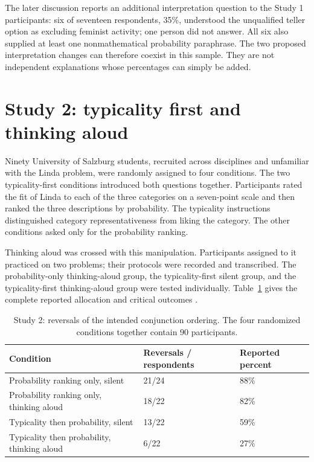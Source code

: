 The later discussion reports an additional interpretation question
to the Study 1 participants: six of seventeen respondents, 35\%,
understood the unqualified teller option as excluding feminist
activity; one person did not answer. All six also supplied at least
one nonmathematical probability paraphrase.
The two proposed interpretation changes can therefore coexist in
this sample. They are not independent explanations whose percentages
can simply be added.

\section{Study 2: typicality first and thinking aloud}
\label{sec:p19-conjunction-language-study-two}

Ninety University of Salzburg students, recruited across disciplines
and unfamiliar with the Linda problem, were randomly assigned to
four conditions. The two typicality-first conditions introduced
both questions together. Participants rated the fit of Linda to
each of the three categories on a seven-point scale and then ranked
the three descriptions by probability. The typicality instructions
distinguished category representativeness from liking the category.
The other conditions asked only for the probability ranking.

Thinking aloud was crossed with this manipulation. Participants
assigned to it practiced on two problems; their protocols were
recorded and transcribed. The probability-only thinking-aloud group,
the typicality-first silent group, and the typicality-first
thinking-aloud group were tested individually.
Table~\ref{tab:p19-conjunction-typicality-first} gives the complete
reported allocation and critical outcomes
\cite[pp.~283--285]{HertwigGigerenzer1999Conjunction}.

\begin{table}[htbp]
\centering
\begin{tabular}{p{}p{}p{}}
\hline
Condition & Reversals / respondents & Reported percent\\ \hline
Probability ranking only, silent &21/24&88\%\\
Probability ranking only, thinking aloud &18/22&82\%\\
Typicality then probability, silent &13/22&59\%\\
Typicality then probability, thinking aloud &6/22&27\%\\ \hline
\end{tabular}
\caption{Study 2: reversals of the intended conjunction ordering.
The four randomized conditions together contain 90 participants.}
\label{tab:p19-conjunction-typicality-first}
\end{table}

